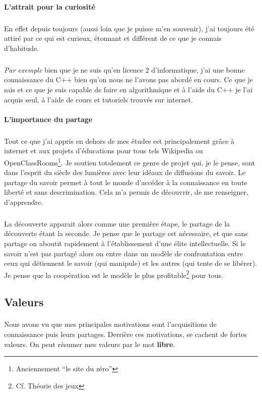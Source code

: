 \documentclass[a4paper,12pt, draft]{report}
\begin{document}
\paragraph{L'attrait pour la curiosité}
\subparagraph{}
En effet depuis toujours (aussi loin que je puisse m'en souvenir), j'ai toujours été attiré par ce qui est curieux, étonnant et différent de ce que je connais d'habitude.
\subparagraph{}
\textit{Par exemple} bien que je ne suis qu'en licence 2 d'informatique, j'ai une bonne connaissance du C++ bien qu'on nous ne l'avons pas abordé en cours. Ce que je sais et ce que je suis capable de faire en algorithmique et à l'aide du C++ je l'ai acquis seul, à l'aide de cours et tutoriels trouvés sur internet. 

\paragraph{L'importance du partage}
\subparagraph{}
Tout ce que j'ai appris en dehors de mes études est principalement grâce à internet et aux projets d'éducations pour tous tels Wikipedia ou OpenClassRooms\footnote{Anciennement ``le site du zéro''}.
Je soutien totalement ce genre de projet qui, je le pense, sont dans l'esprit du siècle des lumières avec leur idéaux de diffusions du savoir. Le partage du savoir permet à tout le monde d'accéder à la connaissance en toute liberté et sans descrimination. Cela m'a permis de découvrir, de me renseigner, d'apprendre. 

\subparagraph{}
La découverte apparait alors comme une première étape, le partage de la découverte étant la seconde. Je pense que le partage est nécessaire, et que sans partage on aboutit rapidement  à l'établissement d'une élite intellectuelle. Si le savoir n'est pas partagé alors on entre dans un modèle de confrontation entre ceux qui détiennent le savoir (qui manipule) et les autres (qui tente de se libérer). Je pense que la coopération est le modèle le plus profitable\footnote{Cf. Théorie des jeux} pour tous.




\subsection{Valeurs}
\paragraph{}
Nous avons vu que mes principales motivations sont l'acquisitions de connaissance puis leurs partages. Derrière ces motivations, se cachent de fortes valeurs.
On peut résumer mes valeurs par le mot \textbf{libre}.
\end{document}
